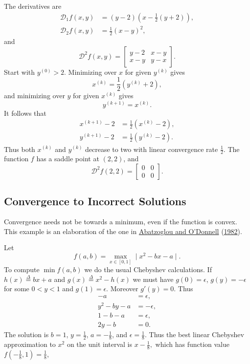 \documentclass[
  12pt,
]{book}
\begin{document}
The derivatives are
\begin{align*}
\mathcal{D}_1f(x,y)&=(y-2)(x-\frac12(y+2)),\\
\mathcal{D}_2f(x,y)&=\frac12(x-y)^2,
\end{align*}
and
\[
\mathcal{D}^2f(x,y)=\begin{bmatrix}
y-2&x-y\\
x-y&y-x
\end{bmatrix}.
\]
Start with \(y^{(0)}>2\). Minimizing over \(x\) for given \(y^{(k)}\) gives
\[
x^{(k)}=\frac12(y^{(k)}+2),
\]
and minimizing over \(y\) for given \(x^{(k)}\) gives
\[
y^{(k+1)}=x^{(k)}.
\]
It follows that
\begin{align*}
x^{(k+1)}-2&=\frac12(x^{(k)}-2),\\
y^{(k+1)}-2&=\frac12(y^{(k)}-2).
\end{align*}
Thus both \(x^{(k)}\) and \(y^{(k)}\) decrease to two with linear convergence rate \(\frac12\). The function \(f\)
has a saddle point at \((2,2)\), and
\[
\mathcal{D}^2f(2,2)=
\begin{bmatrix}0&0\\0&0\end{bmatrix}.
\]

\hypertarget{blockrelaxation:somecounterexamples:convergencetoincorrectsolutions}{%
\subsection{Convergence to Incorrect Solutions}\label{blockrelaxation:somecounterexamples:convergencetoincorrectsolutions}}

Convergence needs not be towards a minimum, even if the
function is convex. This example is an elaboration of the one in \protect\hyperlink{ref-abatzoglou_odonnell_82}{Abatzoglou and O'Donnell} (\protect\hyperlink{ref-abatzoglou_odonnell_82}{1982}).

Let
\[
f(a,b)=\max_{x\in [0,1]}\mid x^2-bx-a\mid.
\]
To compute \(\min f(a,b)\) we do the usual Chebyshev calculations. If \(h(x)\mathop{=}\limits^{\Delta}bx+a\) and \(g(x)\mathop{=}\limits^{\Delta}x^2-h(x)\) we must
have \(g(0)=\epsilon\), \(g(y)=-\epsilon\) for some \(0<y<1\) and \(g(1)=\epsilon\). Moreover \(g'(y)=0\). Thus
\begin{align*}
-a&=\epsilon,\\
y^2-by-a&=-\epsilon,\\
1-b-a&=\epsilon,\\
2y-b&=0.
\end{align*}
The solution is \(b=1\), \(y=\frac12\), \(a=-\frac18\), and \(\epsilon=\frac18\).
Thus the best linear Chebyshev approximation to \(x^2\) on the unit interval
is \(x-\frac{1}{8},\) which has function value \(f(-\frac18,1)=\frac18\),
\end{document}
